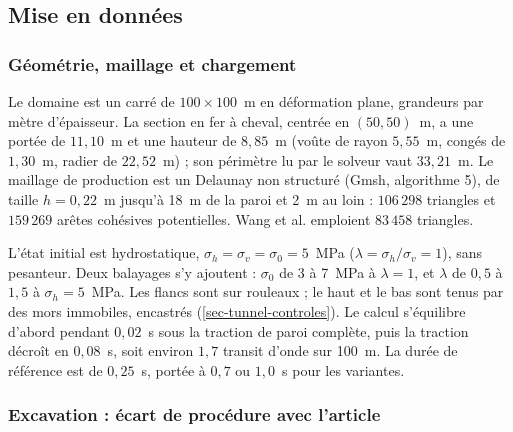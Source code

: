 \subsection{Mise en données}

\subsubsection{Géométrie, maillage et chargement}

Le domaine est un carré de $100 \times 100$~m en déformation plane, grandeurs par mètre d'épaisseur. La section en fer à cheval, centrée en $(50, 50)$~m, a une portée de $11{,}10$~m et une hauteur de $8{,}85$~m (voûte de rayon $5{,}55$~m, congés de $1{,}30$~m, radier de $22{,}52$~m) ; son périmètre lu par le solveur vaut $33{,}21$~m. Le maillage de production est un Delaunay non structuré (Gmsh, algorithme 5), de taille $h = 0{,}22$~m jusqu'à 18~m de la paroi et 2~m au loin : $106\,298$ triangles et $159\,269$ arêtes cohésives potentielles. Wang et al. emploient $83\,458$ triangles.

L'état initial est hydrostatique, $\sigma_h = \sigma_v = \sigma_0 = 5$~MPa ($\lambda = \sigma_h/\sigma_v = 1$), sans pesanteur. Deux balayages s'y ajoutent : $\sigma_0$ de 3 à 7~MPa à $\lambda = 1$, et $\lambda$ de $0{,}5$ à $1{,}5$ à $\sigma_h = 5$~MPa. Les flancs sont sur rouleaux ; le haut et le bas sont tenus par des mors immobiles, encastrés (\cref{sec-tunnel-controles}). Le calcul s'équilibre d'abord pendant $0{,}02$~s sous la traction de paroi complète, puis la traction décroît en $0{,}08$~s, soit environ $1{,}7$ transit d'onde sur 100~m. La durée de référence est de $0{,}25$~s, portée à $0{,}7$ ou $1{,}0$~s pour les variantes.

\subsubsection{Excavation : écart de procédure avec l'article}

